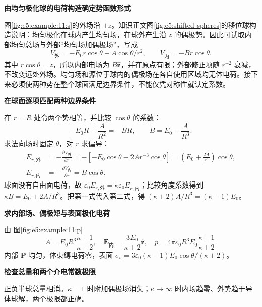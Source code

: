 \begin{solution}\textbf{由均匀极化球的电荷构造确定势函数形式}\par\nobreak
图\ref{fig:e5:example:11:s}的外场沿 $+z$。知识正文图\ref{fig:e5:shifted-spheres}的移位球构造说明：均匀极化在球内产生均匀场，在球外产生沿 $z$ 的偶极势。因此可试取内部均匀总场与外部“均匀场加偶极场”，写成
\[
 V_{\text{外}}=-E_0r\cos\theta+A\cos\theta/r^2,\qquad
 V_{\text{内}}=-Br\cos\theta.
\]
其中 $r\cos\theta=z$，所以内部电场为 $B\hat{\bm z}$，并在原点有限；外部修正项随 $r^{-2}$ 衰减，不改变远处外场。均匀场和源位于球内的偶极场在各自使用区域均无体电荷。接下来必须使两种势在整个球面满足边界条件，不能仅凭对称性就认定系数。


\par\medskip{}\noindent\textbf{在球面逐项匹配两种边界条件}\par\nobreak
在 $r=R$ 处令两个势相等，并比较 $\cos\theta$ 的系数：
\[
-E_0R+\frac A{R^2}=-BR,\qquad B=E_0-\frac A{R^3}.
\]
求法向场时固定 $\theta$，对 $r$ 求偏导：
\begin{align*}
E_{r,\text{外}}
&=-\frac{\partial V_{\text{外}}}{\partial r}
=-\left[-E_0\cos\theta-2Ar^{-3}\cos\theta\right]
=\left(E_0+\frac{2A}{r^3}\right)\cos\theta,\\
E_{r,\text{内}}
&=-\frac{\partial V_{\text{内}}}{\partial r}=B\cos\theta.
\end{align*}
球面没有自由面电荷，故 $\varepsilon_0E_{r,\text{外}}=\kappa\varepsilon_0E_{r,\text{内}}$；比较角度系数得到 $\kappa B=E_0+2A/R^3$。把第一式代入第二式，得 $(\kappa+2)A/R^3=(\kappa-1)E_0$。



\par\medskip{}\noindent\textbf{求内部场、偶极矩与表面极化电荷}\par\nobreak
由 图\ref{fig:e5:example:11:p}
\[
 A=E_0R^3\frac{\kappa-1}{\kappa+2},\quad
 \bm E_{\text{内}}=\frac{3E_0}{\kappa+2}\hat{\bm z},\quad
 p=4\pi\varepsilon_0R^3E_0\frac{\kappa-1}{\kappa+2}.
\]
内部 $\bm P$ 均匀，体束缚电荷零，表面 $\sigma_b=3\varepsilon_0(\kappa-1)E_0\cos\theta/(\kappa+2)$。

\par\medskip{}\noindent\textbf{检查总量和两个介电常数极限}\par\nobreak
正负半球总量相消。$\kappa=1$ 时附加偶极场消失；$\kappa\to\infty$ 时内场趋零、外势趋于导体球解，两个极限都正确。\end{solution}
